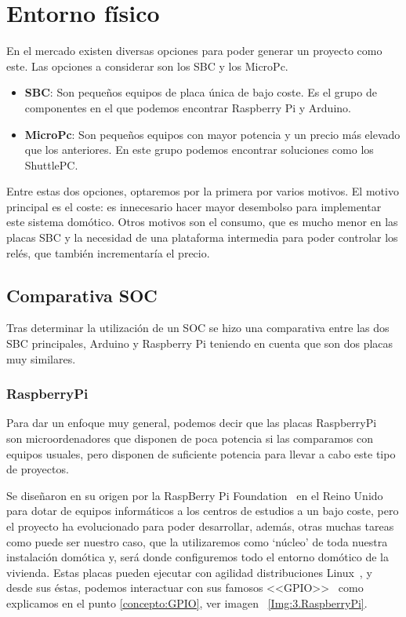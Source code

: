 \section{Entorno físico}

En el mercado existen diversas opciones para poder generar un proyecto como este. Las opciones a considerar son los SBC y los MicroPc.
\begin{itemize}
    \item \textbf{SBC}: Son pequeños equipos de placa única de bajo coste. Es el grupo de componentes en el que podemos encontrar Raspberry Pi y Arduino.
    \item \textbf{MicroPc}: Son pequeños equipos con mayor potencia y un precio más elevado que los anteriores. En este grupo podemos encontrar soluciones como los ShuttlePC.
\end{itemize}

Entre estas dos opciones, optaremos por la primera por varios motivos. El motivo principal es el coste: es innecesario hacer mayor desembolso para implementar este sistema domótico. Otros motivos son el consumo, que es mucho menor en las placas SBC y la necesidad de una plataforma intermedia para poder controlar los relés, que también incrementaría el precio.

\subsection{Comparativa SOC}
Tras determinar la utilización de un SOC se hizo una comparativa entre las dos SBC principales, Arduino y Raspberry Pi teniendo en cuenta que son dos placas muy similares.

\subsubsection{RaspberryPi}\label{4:RaspberryPi}
Para dar un enfoque muy general, podemos decir que las placas RaspberryPi~\cite{misc:RbPWeb} son microordenadores que disponen de poca potencia si las comparamos con equipos usuales, pero disponen de suficiente potencia para llevar a cabo este tipo de proyectos.

Se diseñaron en su origen por la RaspBerry Pi Foundation~\cite{misc:RbPWeb} en el Reino Unido para dotar de equipos informáticos a los centros de estudios a un bajo coste, pero el proyecto ha evolucionado para poder desarrollar, además, otras muchas tareas como puede ser nuestro caso, que la utilizaremos como ‘núcleo’ de toda nuestra instalación domótica y, será donde configuremos todo el entorno domótico de la vivienda.
Estas placas pueden ejecutar con agilidad distribuciones Linux~\cite{misc:Linux}, y desde sus éstas, podemos interactuar con sus famosos <<GPIO>>~\cite{misc:descubrearduino} como explicamos en el punto \ref{concepto:GPIO}, ver imagen ~\ref{Img:3.RaspberryPi}.

